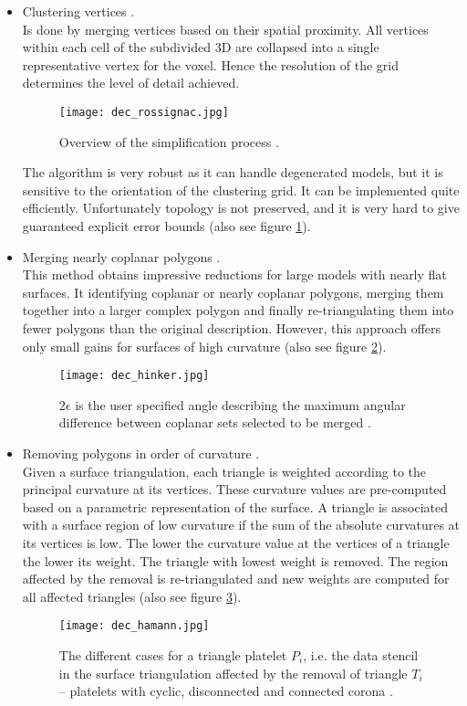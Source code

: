 \begin{itemize}
    \item Clustering vertices \citep[cf.][]{Rossignac1993}.\\
Is done by merging vertices based on their spatial proximity. All vertices within each cell of the subdivided 3D are collapsed into a single representative vertex for the voxel. Hence the resolution of the grid determines the level of detail achieved.
\begin{figure}[ht]
\centering
\texttt{[image: dec\_rossignac.jpg]}
\caption{Overview of the simplification process \citep[][p.458]{Rossignac1993}.}
\label{fig:dec_rossignac}
\end{figure}
The algorithm is very robust as it can handle degenerated models, but it is sensitive to the orientation of the clustering grid. It can be implemented quite efficiently. Unfortunately topology is not preserved, and it is very hard to give guaranteed explicit error bounds (also see figure \ref{fig:dec_rossignac}).

    \item Merging nearly coplanar polygons \citep[cf.][]{Hinker1993}.\\
This method obtains impressive reductions for large models with nearly flat surfaces. It identifying coplanar or nearly coplanar polygons, merging them together into a larger complex polygon and finally re-triangulating them into fewer polygons than the original description. However, this approach offers only small gains
for surfaces of high curvature (also see figure \ref{fig:dec_hinker}).
\begin{figure}[ht]
\centering
\texttt{[image: dec\_hinker.jpg]}
\caption{
$2\epsilon$ is the user specified angle describing the maximum angular difference between coplanar sets selected to be merged \citep[][p.192]{Hinker1993}.}
\label{fig:dec_hinker}
\end{figure}

    \item Removing polygons in order of curvature \citep[cf.][]{Hamann1994}.\\
Given a surface triangulation, each triangle is weighted according to the principal curvature at its vertices.
These curvature values are pre-computed based on a parametric representation of the surface.
A triangle is associated with a surface region of low curvature if the sum of the absolute curvatures at its vertices is low.
The lower the curvature value at the vertices of a triangle the lower its weight.
The triangle with lowest weight is removed.
The region affected by the removal is re-triangulated and new weights are computed for all affected triangles (also see figure \ref{fig:dec_hamann}).
\begin{figure}[ht]
\centering
\texttt{[image: dec\_hamann.jpg]}
\caption{The different cases for a triangle platelet $P_{i}$, i.e. the data stencil in the surface triangulation affected by the removal of triangle $T_{i}$ --  platelets with cyclic, disconnected and connected corona \citep[][p.200]{Hamann1994}.}
\label{fig:dec_hamann}
\end{figure}


\end{itemize}
